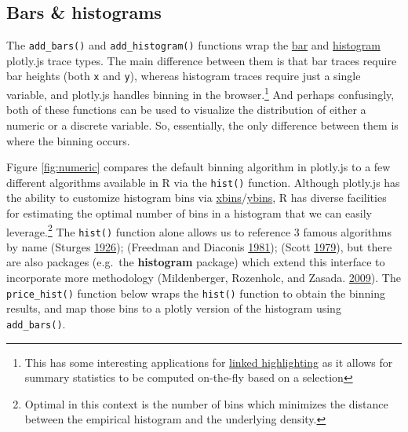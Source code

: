 \documentclass[12pt,]{isuthesis}
\let\rmarkdownfootnote\footnote%
\def\footnote{\protect\rmarkdownfootnote}
\begin{document}
\hypertarget{bars-histograms}{\subsection{Bars \&
histograms}\label{bars-histograms}}

The \texttt{add\_bars()} and \texttt{add\_histogram()} functions wrap
the \href{https://plot.ly/r/reference/\#bar}{bar} and
\href{https://plot.ly/r/reference/\#histogram}{histogram} plotly.js
trace types. The main difference between them is that bar traces require
bar heights (both \texttt{x} and \texttt{y}), whereas histogram traces
require just a single variable, and plotly.js handles binning in the
browser.\footnote{This has some interesting applications for
  \protect\hyperlink{linked-highlighting}{linked highlighting} as it
  allows for summary statistics to be computed on-the-fly based on a
  selection} And perhaps confusingly, both of these functions can be
used to visualize the distribution of either a numeric or a discrete
variable. So, essentially, the only difference between them is where the
binning occurs.

Figure \ref{fig:numeric} compares the default binning algorithm in
plotly.js to a few different algorithms available in R via the
\texttt{hist()} function. Although plotly.js has the ability to
customize histogram bins via
\href{https://plot.ly/r/reference/\#histogram-xbins}{xbins}/\href{https://plot.ly/r/reference/\#histogram-ybins}{ybins},
R has diverse facilities for estimating the optimal number of bins in a
histogram that we can easily leverage.\footnote{Optimal in this context
  is the number of bins which minimizes the distance between the
  empirical histogram and the underlying density.} The \texttt{hist()}
function alone allows us to reference 3 famous algorithms by name
(Sturges \protect\hyperlink{ref-Sturges}{1926}); (Freedman and Diaconis
\protect\hyperlink{ref-FD}{1981}); (Scott
\protect\hyperlink{ref-hist-scott}{1979}), but there are also packages
(e.g.~the \textbf{histogram} package) which extend this interface to
incorporate more methodology (Mildenberger, Rozenholc, and Zasada.
\protect\hyperlink{ref-histogram}{2009}). The \texttt{price\_hist()}
function below wraps the \texttt{hist()} function to obtain the binning
results, and map those bins to a plotly version of the histogram using
\texttt{add\_bars()}.
\end{document}
